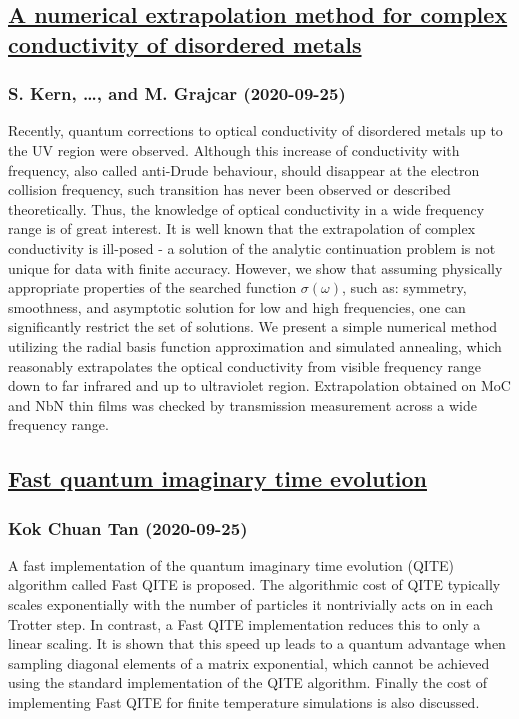 \subsection*{\href{http://arxiv.org/abs/2009.12249v1}{A numerical extrapolation method for complex conductivity of disordered  metals}}
\subsubsection*{S. Kern, \dots, and M. Grajcar (2020-09-25)}
Recently, quantum corrections to optical conductivity of disordered metals up
to the UV region were observed. Although this increase of conductivity with
frequency, also called anti-Drude behaviour, should disappear at the electron
collision frequency, such transition has never been observed or described
theoretically. Thus, the knowledge of optical conductivity in a wide frequency
range is of great interest. It is well known that the extrapolation of complex
conductivity is ill-posed - a solution of the analytic continuation problem is
not unique for data with finite accuracy. However, we show that assuming
physically appropriate properties of the searched function $\sigma(\omega)$,
such as: symmetry, smoothness, and asymptotic solution for low and high
frequencies, one can significantly restrict the set of solutions. We present a
simple numerical method utilizing the radial basis function approximation and
simulated annealing, which reasonably extrapolates the optical conductivity
from visible frequency range down to far infrared and up to ultraviolet region.
Extrapolation obtained on MoC and NbN thin films was checked by transmission
measurement across a wide frequency range.

\subsection*{\href{http://arxiv.org/abs/2009.12239v1}{Fast quantum imaginary time evolution}}
\subsubsection*{Kok Chuan Tan (2020-09-25)}
A fast implementation of the quantum imaginary time evolution (QITE)
algorithm called Fast QITE is proposed. The algorithmic cost of QITE typically
scales exponentially with the number of particles it nontrivially acts on in
each Trotter step. In contrast, a Fast QITE implementation reduces this to only
a linear scaling. It is shown that this speed up leads to a quantum advantage
when sampling diagonal elements of a matrix exponential, which cannot be
achieved using the standard implementation of the QITE algorithm. Finally the
cost of implementing Fast QITE for finite temperature simulations is also
discussed.


